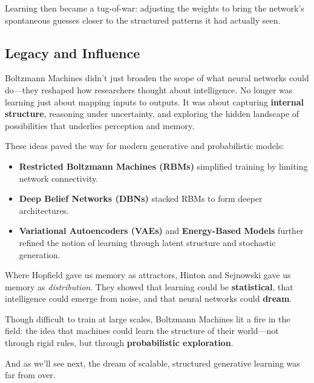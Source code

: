 Learning then became a tug-of-war: adjusting the weights to bring the network’s spontaneous guesses closer to the structured patterns it had actually seen.

\subsection{Legacy and Influence}

Boltzmann Machines didn’t just broaden the scope of what neural networks could do—they reshaped how researchers thought about intelligence. No longer was learning just about mapping inputs to outputs. It was about capturing \textbf{internal structure}, reasoning under uncertainty, and exploring the hidden landscape of possibilities that underlies perception and memory.

These ideas paved the way for modern generative and probabilistic models:
\begin{itemize}
  \item \textbf{Restricted Boltzmann Machines (RBMs)} simplified training by limiting network connectivity.
  \item \textbf{Deep Belief Networks (DBNs)} stacked RBMs to form deeper architectures.
  \item \textbf{Variational Autoencoders (VAEs)} and \textbf{Energy-Based Models} further refined the notion of learning through latent structure and stochastic generation.
\end{itemize}

\begin{tcolorbox}[colback=blue!5!white, colframe=blue!50!black,
title={Sidebar: Hinton and Sejnowski Redefine Intelligence}]
Where Hopfield gave us memory as attractors,  
Hinton and Sejnowski gave us memory as \textit{distribution}.  
They showed that learning could be \textbf{statistical},  
that intelligence could emerge from noise,  
and that neural networks could \textbf{dream}.
\end{tcolorbox}

Though difficult to train at large scales, Boltzmann Machines lit a fire in the field: the idea that machines could learn the structure of their world—not through rigid rules, but through \textbf{probabilistic exploration}.

And as we’ll see next, the dream of scalable, structured generative learning was far from over.
